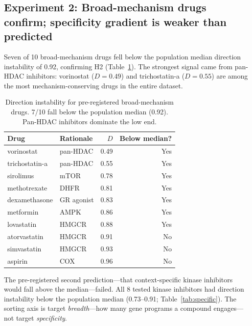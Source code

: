 \documentclass{article}
\begin{document}
\subsection{Experiment 2: Broad-mechanism drugs confirm; specificity gradient is weaker than predicted}

Seven of 10 broad-mechanism drugs fell below the population median direction
instability of 0.92, confirming H2 (Table~\ref{tab:broad}). The strongest
signal came from pan-HDAC inhibitors: vorinostat ($D = 0.49$) and
trichostatin-a ($D = 0.55$) are among the most mechanism-conserving drugs
in the entire dataset.

\begin{table}[h]
\centering
\caption{Direction instability for pre-registered broad-mechanism drugs.
7/10 fall below the population median (0.92). Pan-HDAC inhibitors dominate
the low end.}
\label{tab:broad}
\small
\begin{tabular}{llrr}
\toprule
Drug & Rationale & $D$ & Below median? \\
\midrule
vorinostat & pan-HDAC & 0.49 & Yes \\
trichostatin-a & pan-HDAC & 0.55 & Yes \\
sirolimus & mTOR & 0.78 & Yes \\
methotrexate & DHFR & 0.81 & Yes \\
dexamethasone & GR agonist & 0.83 & Yes \\
metformin & AMPK & 0.86 & Yes \\
lovastatin & HMGCR & 0.88 & Yes \\
atorvastatin & HMGCR & 0.91 & No \\
simvastatin & HMGCR & 0.93 & No \\
aspirin & COX & 0.96 & No \\
\bottomrule
\end{tabular}
\end{table}

The pre-registered second prediction---that context-specific kinase
inhibitors would fall above the median---failed. All 8 tested kinase
inhibitors had direction instability below the population median (0.73--0.91;
Table~\ref{tab:specific}). The sorting axis is target \emph{breadth}---how
many gene programs a compound engages---not target \emph{specificity}.
\end{document}
